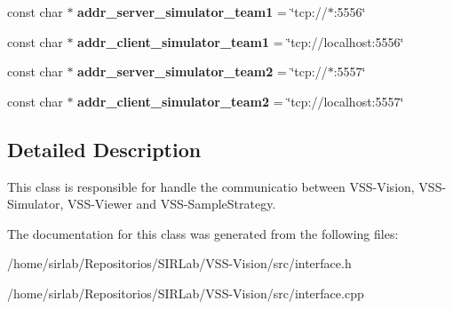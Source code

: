 \begin{DoxyCompactItemize}
\item 
\hypertarget{classInterface_a4315a24cd5d7156ccb6da180cc5a825e}{const char $\ast$ {\bfseries addr\-\_\-server\-\_\-simulator\-\_\-team1} = \char`\"{}tcp\-://$\ast$\-:5556\char`\"{}}\label{classInterface_a4315a24cd5d7156ccb6da180cc5a825e}

\item 
\hypertarget{classInterface_aa05d667c54fc41c5dc6fe7aa8a85ef5d}{const char $\ast$ {\bfseries addr\-\_\-client\-\_\-simulator\-\_\-team1} = \char`\"{}tcp\-://localhost\-:5556\char`\"{}}\label{classInterface_aa05d667c54fc41c5dc6fe7aa8a85ef5d}

\item 
\hypertarget{classInterface_ae358e6d8cb691934a5dc23c4a718082b}{const char $\ast$ {\bfseries addr\-\_\-server\-\_\-simulator\-\_\-team2} = \char`\"{}tcp\-://$\ast$\-:5557\char`\"{}}\label{classInterface_ae358e6d8cb691934a5dc23c4a718082b}

\item 
\hypertarget{classInterface_adad17a36b3382235441861a3648bd807}{const char $\ast$ {\bfseries addr\-\_\-client\-\_\-simulator\-\_\-team2} = \char`\"{}tcp\-://localhost\-:5557\char`\"{}}\label{classInterface_adad17a36b3382235441861a3648bd807}

\end{DoxyCompactItemize}


\subsection{Detailed Description}
This class is responsible for handle the communicatio between V\-S\-S-\/\-Vision, V\-S\-S-\/\-Simulator, V\-S\-S-\/\-Viewer and V\-S\-S-\/\-Sample\-Strategy. 

The documentation for this class was generated from the following files\-:\begin{DoxyCompactItemize}
\item 
/home/sirlab/\-Repositorios/\-S\-I\-R\-Lab/\-V\-S\-S-\/\-Vision/src/interface.\-h\item 
/home/sirlab/\-Repositorios/\-S\-I\-R\-Lab/\-V\-S\-S-\/\-Vision/src/interface.\-cpp\end{DoxyCompactItemize}
